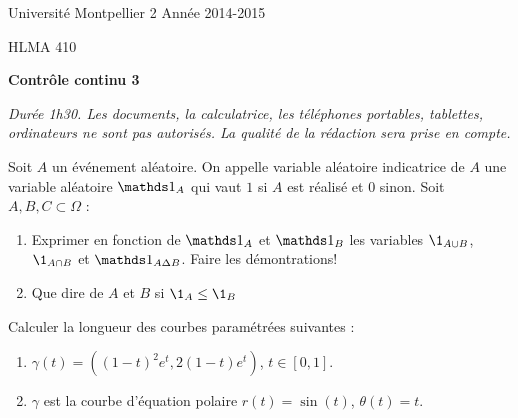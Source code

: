 \documentclass[a4paper]{article}
\begin{document}
\noindent Université Montpellier 2 \hfill Année 2014-2015

\noindent HLMA 410
 


\bigskip

\begin{center}
{\large \sffamily\bfseries Contrôle continu 3}
\end{center}

\textit{Durée 1h30. Les documents, la calculatrice, les téléphones portables, tablettes, ordinateurs ne sont pas autorisés. La qualité de la rédaction sera prise en compte.} 

\bigskip
\bigskip

Soit $A$ un événement aléatoire. On appelle variable aléatoire indicatrice de $A$ une variable aléatoire $\one_A$ qui vaut $1$ si $A$ est réalisé et $0$ sinon. Soit $A,B,C \subset \Omega$ :
\begin{enumerate}
	\item Exprimer en fonction de $\one_A$ et $\one_B$ les variables $\1_{A\cup B}$, $\1_{A \cap B}$ et $\one_{A\Delta B}$. Faire les démontrations!
		\vspace*{15cm}

	\item Que dire de $A$ et $B$ si $\1_A \leq \1_B$
		\vspace*{3cm}
\end{enumerate}

\newpage

 Calculer la longueur des courbes param\'etr\'ees suivantes :
\begin{enumerate}
\item $\gamma(t)=((1-t)^2e^t,2(1-t)e^t)$, $t\in [0,1]$.
	\vspace*{16cm}
\item $\gamma$ est la courbe d'\'equation polaire $r(t)=\sin(t)$, $\theta(t)=t$.
	\vfill
	\vspace*{8cm}
\end{enumerate}
\end{document}
